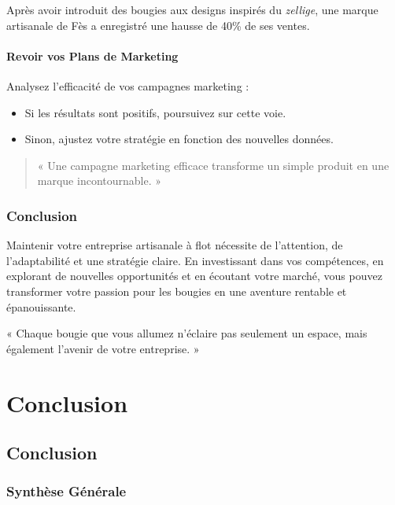\documentclass[11pt,fleqn,onecolumn,oneside]{book}
\begin{document}
\begin{example}
Après avoir introduit des bougies aux designs inspirés du \textit{zellige}, une marque artisanale de Fès a enregistré une hausse de 40\% de ses ventes.
\end{example}

\subsection*{Revoir vos Plans de Marketing}

Analysez l'efficacité de vos campagnes marketing :
\begin{itemize}
    \item Si les résultats sont positifs, poursuivez sur cette voie.
    \item Sinon, ajustez votre stratégie en fonction des nouvelles données.
\end{itemize}

\begin{quote}
« Une campagne marketing efficace transforme un simple produit en une marque incontournable. »
\end{quote}

\section{Conclusion}

Maintenir votre entreprise artisanale à flot nécessite de l’attention, de l’adaptabilité et une stratégie claire. En investissant dans vos compétences, en explorant de nouvelles opportunités et en écoutant votre marché, vous pouvez transformer votre passion pour les bougies en une aventure rentable et épanouissante.

\begin{corollary}
« Chaque bougie que vous allumez n’éclaire pas seulement un espace, mais également l’avenir de votre entreprise. » 
\end{corollary}

\part{Conclusion}
\chapter*{Conclusion}

\section*{Synthèse Générale}
\end{document}
